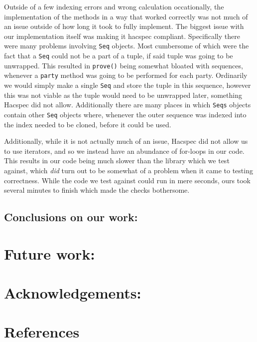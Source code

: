 \documentclass{article}
\begin{document}
Outside of a few indexing errors and wrong calculation occationally, the implementation of the methods in a way that worked correctly was not much of an issue outside of how long it took to fully implement. The biggest issue with our implementation itself was making it hacspec compliant. Specifically there were many problems involving \texttt{Seq} objects. Most cumbersome of which were the fact that a \texttt{Seq} could not be a part of a tuple, if said tuple was going to be unwrapped. This resulted in \texttt{prove()} being somewhat bloated with sequences, whenever a \texttt{party} method was going to be performed for each party. Ordinarily we would simply make a single \texttt{Seq} and store the tuple in this sequence, however this was not viable as the tuple would need to be unwrapped later, something Hacspec did not allow. Additionally there are many places in which \texttt{Seqs} objects contain other \texttt{Seq} objects where, whenever the outer sequence was indexed into the index needed to be cloned, before it could be used. 

Additionally, while it is not actually much of an issue, Hacspec did not allow us to use iterators, and so we instead have an abundance of for-loops in our code. This results in our code being much slower than the library which we test against, which \textit{did} turn out to be somewhat of a problem when it came to testing correctness. While the code we test against could run in mere seconds, ours took several minutes to finish which made the checks bothersome. 

\subsection{Conclusions on our work:}

\section{Future work:}

\section{Acknowledgements:}


\section{References}
\printbibliography
\end{document}
